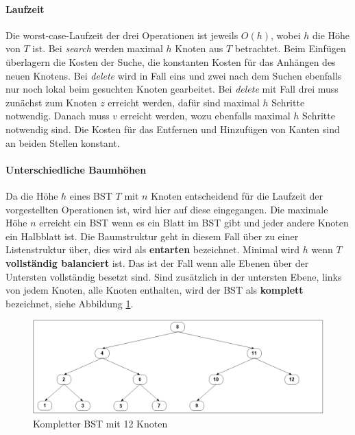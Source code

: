 \documentclass[a4paper,12pt]{article}
\begin{document}
\paragraph{Laufzeit}
Die worst-case-Laufzeit der drei Operationen ist jeweils $\mathit{O(h)}$, wobei $h$ die Höhe von $T$ ist. Bei \textit{search} werden maximal $h$ Knoten aus $T$ betrachtet. Beim Einfügen überlagern die Kosten der Suche, die konstanten Kosten für das Anhängen des neuen Knotens. Bei \textit{delete} wird in Fall eins und zwei nach dem Suchen ebenfalls nur noch lokal beim gesuchten Knoten gearbeitet. Bei \textit{delete} mit Fall drei muss zunächst zum Knoten $z$ erreicht werden, dafür sind maximal $h$ Schritte notwendig. Danach muss $v$ erreicht werden, wozu ebenfalls maximal $h$ Schritte notwendig sind. Die Kosten für das Entfernen und Hinzufügen von Kanten sind an beiden Stellen konstant.  



\paragraph{Unterschiedliche Baumhöhen}
Da die Höhe $h$ eines BST $T$ mit $n$ Knoten entscheidend für die Laufzeit der vorgestellten Operationen ist, wird hier auf diese eingegangen. Die maximale Höhe $n$ erreicht ein BST wenn es ein Blatt im BST gibt und jeder andere Knoten ein Halbblatt ist. Die Baumstruktur geht in diesem Fall über zu einer Listenstruktur über, dies wird als \textbf{entarten} bezeichnet. Minimal wird $h$ wenn $T$ \textbf{vollständig balanciert} ist. Das ist der Fall wenn alle Ebenen über der Untersten vollständig besetzt sind. Sind zusätzlich in der untersten Ebene, links von jedem Knoten, alle Knoten enthalten, wird der BST als \textbf{komplett} bezeichnet, siehe Abbildung \ref{fig:kompletterBaum}. 
\begin{figure}[h]
	\centering
	\includegraphics[width= 1\textwidth]{"Medien/Einleitung/kompletterBaum"}
	\caption{Kompletter BST mit 12 Knoten}
	\label{fig:kompletterBaum}
\end{figure}
\end{document}
